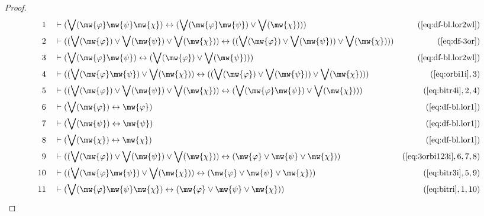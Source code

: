 \begin{proof}
\begin{align}
  1 &&  & \vdash ( \bigvee( \mw{\varphi} \mw{\psi} \mw{\chi} ) \leftrightarrow
     ( \bigvee( \mw{\varphi} \mw{\psi} ) \vee \bigvee(
     \mw{\chi} ) ) )&(\mbox{\ref{eq:df-bl.lor2wl}})\notag
  \\ 2 &&  & \vdash ( ( \bigvee( \mw{\varphi} ) \vee \bigvee( \mw{\psi} ) \vee
     \bigvee( \mw{\chi} ) ) \leftrightarrow ( ( \bigvee(
     \mw{\varphi} ) \vee \bigvee( \mw{\psi} ) ) \vee
     \bigvee( \mw{\chi} ) )
     )&(\mbox{\ref{eq:df-3or}})\notag
  \\ 3 &&  & \vdash ( \bigvee( \mw{\varphi} \mw{\psi} ) \leftrightarrow (
     \bigvee( \mw{\varphi} ) \vee \bigvee( \mw{\psi} ) )
     )&(\mbox{\ref{eq:df-bl.lor2wl}})\notag
  \\ 4 &&  & \vdash ( ( \bigvee( \mw{\varphi} \mw{\psi} ) \vee \bigvee(
     \mw{\chi} ) ) \leftrightarrow ( ( \bigvee(
     \mw{\varphi} ) \vee \bigvee( \mw{\psi} ) ) \vee
     \bigvee( \mw{\chi} ) )
     )&(\mbox{\ref{eq:orbi1i}},3)\notag
  \\ 5 &&  & \vdash ( ( \bigvee( \mw{\varphi} ) \vee \bigvee( \mw{\psi} ) \vee
     \bigvee( \mw{\chi} ) ) \leftrightarrow ( \bigvee(
     \mw{\varphi} \mw{\psi} ) \vee \bigvee( \mw{\chi} ) )
     )&(\mbox{\ref{eq:bitr4i}},2,4)\notag
  \\ 6 &&  & \vdash ( \bigvee( \mw{\varphi} ) \leftrightarrow \mw{\varphi}
     )&(\mbox{\ref{eq:df-bl.lor1}})\notag
  \\ 7 &&  & \vdash ( \bigvee( \mw{\psi} ) \leftrightarrow \mw{\psi}
     )&(\mbox{\ref{eq:df-bl.lor1}})\notag
  \\ 8 &&  & \vdash ( \bigvee( \mw{\chi} ) \leftrightarrow \mw{\chi}
     )&(\mbox{\ref{eq:df-bl.lor1}})\notag
  \\ 9 &&  & \vdash ( ( \bigvee( \mw{\varphi} ) \vee \bigvee( \mw{\psi} ) \vee
     \bigvee( \mw{\chi} ) ) \leftrightarrow ( \mw{\varphi}
     \vee \mw{\psi} \vee \mw{\chi} )
     )&(\mbox{\ref{eq:3orbi123i}},6,7,8)\notag
  \\ 10 &&  & \vdash ( ( \bigvee( \mw{\varphi} \mw{\psi} ) \vee \bigvee(
     \mw{\chi} ) ) \leftrightarrow ( \mw{\varphi} \vee
     \mw{\psi} \vee \mw{\chi} )
     )&(\mbox{\ref{eq:bitr3i}},5,9)\notag
  \\ 11 &&  & \vdash ( \bigvee( \mw{\varphi} \mw{\psi} \mw{\chi} )
     \leftrightarrow ( \mw{\varphi} \vee \mw{\psi} \vee
     \mw{\chi} ) )&(\mbox{\ref{eq:bitri}},1,10)\notag
\end{align}
\end{proof}


